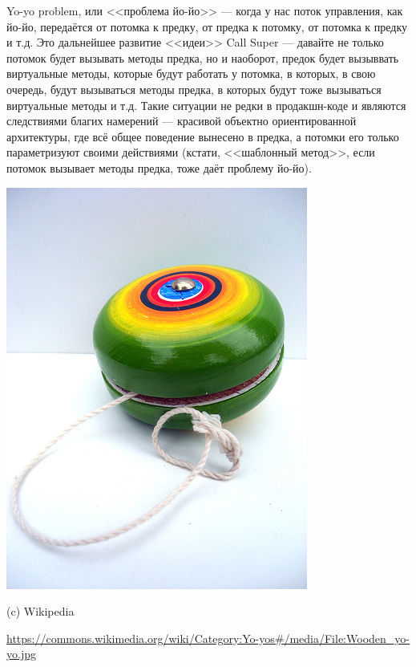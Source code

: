 \documentclass[a5paper]{article}
\newlength\Colsep
\begin{document}
\noindent\begin{minipage}{\textwidth}
    \begin{minipage}[c][6cm][c]{\dimexpr0.7\textwidth-0.5\Colsep\relax}
        Yo-yo problem, или <<проблема йо-йо>> --- когда у нас поток управления, как йо-йо, передаётся от потомка к предку, от предка к потомку, от потомка к предку и т.д. Это дальнейшее развитие <<идеи>> Call Super --- давайте не только потомок будет вызывать методы предка, но и наоборот, предок будет вызыввать виртуальные методы, которые будут работать у потомка, в которых, в свою очередь, будут вызываться методы предка, в которых будут тоже вызываться виртуальные методы и т.д. Такие ситуации не редки в продакшн-коде и являются следствиями благих намерений --- красивой объектно ориентированной архитектуры, где всё общее поведение вынесено в предка, а потомки его только параметризуют своими действиями (кстати, <<шаблонный метод>>, если потомок вызывает методы предка, тоже даёт проблему йо-йо).
    \end{minipage}\hfill
    \begin{minipage}[c][6cm][c]{\dimexpr0.3\textwidth-0.5\Colsep\relax}
        \includegraphics[width=\textwidth]{yo-yo.jpg}

        \footnotesize{(c) Wikipedia}

        \tiny{\url{https://commons.wikimedia.org/wiki/Category:Yo-yos\#/media/File:Wooden\_yo-yo.jpg}}
    \end{minipage}%
\end{minipage}
\end{document}
